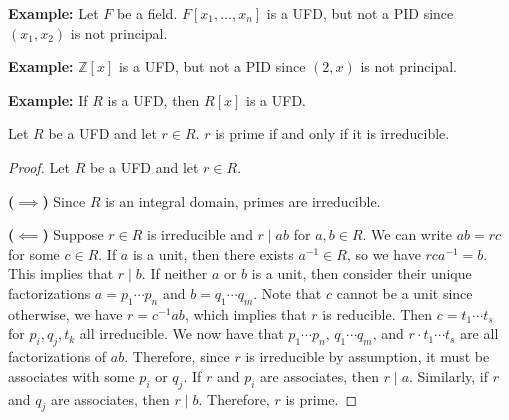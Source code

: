 \documentclass [12pt]{article}
\newcommand{\Z}{\mathbb{Z}}
\newcounter{thmcounter}[section]
\renewcommand{\thethmcounter}{\thesection.\arabic{thmcounter}}
\newenvironment{theorem}[1]{
  \refstepcounter{thmcounter}
  \begin{tcolorbox}[title={Theorem \thethmcounter: #1}, colback=green!5!white, colframe=black!75!green]
}{ \end{tcolorbox} }
\renewcommand{\bf}[1]{\textbf{{#1}}}
\begin{document}
\bf{Example:} Let $F$ be a field. $F[x_1, \ldots, x_n]$ is a UFD, but not a PID since $(x_1, x_2)$
is not principal.
\vspace{1em}

\bf{Example:} $\Z[x]$ is a UFD, but not a PID since $(2, x)$ is not principal.
\vspace{1em}

\bf{Example:} If $R$ is a UFD, then $R[x]$ is a UFD.

\newpage
\begin{theorem}{}
    Let $R$ be a UFD and let $r \in R$. $r$ is prime if and only if it is irreducible.
    \label{thm:pri}
\end{theorem}
\begin{proof}
    Let $R$ be a UFD and let $r \in R$.
    \vspace{0.5em}

    \bf{($\bm{\implies}$)}
    Since $R$ is an integral domain, primes are irreducible.
    \vspace{0.5em}

    \bf{($\bm{\impliedby}$)}
    Suppose $r \in R$ is irreducible and $r \mid ab$ for $a, b \in R$. We can write $ab = rc$ for
    some $c \in R$. If $a$ is a unit, then there exists $a^{-1} \in R$, so we have $rca^{-1} = b$.
    This implies that $r \mid b$. If neither $a$ or $b$ is a unit, then consider their unique
    factorizations $a = p_1 \cdots p_n$ and $b = q_1 \cdots q_m$. Note that $c$ cannot be a unit
    since otherwise, we have $r = c^{-1}ab$, which implies that $r$ is reducible. Then
    $c = t_1 \cdots t_s$ for $p_i, q_j, t_k$ all irreducible. We now have that $p_1 \cdots p_n$,
    $q_1 \cdots q_m$, and $r \cdot t_1 \cdots t_s$ are all factorizations of $ab$. Therefore, since
    $r$ is irreducible by assumption, it must be associates with some $p_i$ or $q_j$. If $r$ and
    $p_i$ are associates, then $r \mid a$. Similarly, if $r$ and $q_j$ are associates, then
    $r \mid b$. Therefore, $r$ is prime.
    \vspace{0.5em}
\end{proof}
\end{document}
